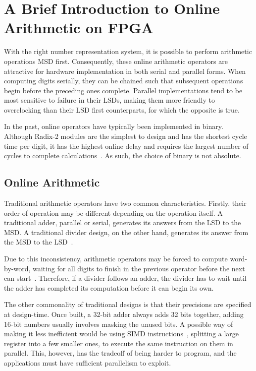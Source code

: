 \section{A Brief Introduction to Online Arithmetic on FPGA}

With the right number representation system, it is possible to perform arithmetic operations MSD first.
Consequently, these online arithmetic operators are attractive for hardware implementation in both serial and parallel forms.
When computing digits serially, they can be chained such that subsequent operations begin before the preceding ones complete.
Parallel implementations tend to be most sensitive to failure in their LSDs, making them more friendly to overclocking than their LSD first counterparts, for which the opposite is true.

In the past, online operators have typically been implemented in binary.
Although Radix-2 modules are the simplest to design and has the shortest cycle time per digit, it has the highest online delay and requires the largest number of cycles to complete calculations~\cite{Tenca1}.
As such, the choice of binary is not absolute.

\subsection{Online Arithmetic}
Traditional arithmetic operators have two common characteristics.
Firstly, their order of operation may be different depending on the operation itself.
A traditional adder, parallel or serial, generates its answers from the LSD to the MSD.
A traditional divider design, on the other hand, generates its answer from the MSD to the LSD~\cite{Brent1}\cite{Srinivas1}.

Due to this inconsistency, arithmetic operators may be forced to compute word-by-word, waiting for all digits to finish in the previous operator before the next can start~\cite{Zhao1}.
Therefore, if a divider follows an adder, the divider has to wait until the adder has completed its computation before it can begin its own.

The other commonality of traditional designs is that their precisions are specified at design-time.
Once built, a 32-bit adder always adds 32 bits together, adding 16-bit numbers usually involves masking the unused bits.
A possible way of making it less inefficient would be using SIMD instructions~\cite{Duncan1}, splitting a large register into a few smaller ones, to execute the same instruction on them in parallel.
This, however, has the tradeoff of being harder to program, and the applications must have sufficient parallelism to exploit.

